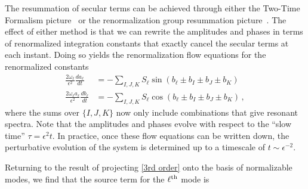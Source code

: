 \documentclass[letterpaper,11pt]{article}
\newcommand{\ol}{\omega_\ell}
\begin{document}
The resummation of secular terms can be achieved through either the Two-Time Formalism picture~\cite{1403.6471} or the renormalization group resummation picture~\cite{1412.3249}. The effect of either method is that we can rewrite the amplitudes and phases in terms of renormalized integration constants that exactly cancel the secular terms at each instant. Doing so yields the renormalization flow equations for the renormalized constants~\cite{1407.6273}
\begin{align}
\label{RN flow 1}
\frac{2 \ol}{\epsilon^2} \frac{d a_\ell}{d t} &= - \sum_{I,J,K} S_\ell \sin \left( b_\ell \pm b_I \pm b_J \pm b_K \right) \\
\label{RN flow 2}
\frac{2 \ol a_\ell}{\epsilon^2} \frac{d b_\ell}{d t} &= - \sum_{I,J,K} S_\ell \cos \left( b_\ell \pm b_I \pm b_J \pm b_K \right) \, ,
\end{align}
where the sums over ${\{I,J,K\}}$ now only include combinations that give resonant spectra. Note that the amplitudes and phases evolve with respect to the ``slow time'' $\tau = \epsilon^2 t$. In practice, once these flow equations can be written down, the perturbative evolution of the system is determined up to a timescale of $t \sim \epsilon^{-2}$.

Returning to the result of projecting \eqref{3rd order} onto the basis of normalizable modes, we find that the source term for the $\ell^{\rm th}$ mode is
\end{document}
